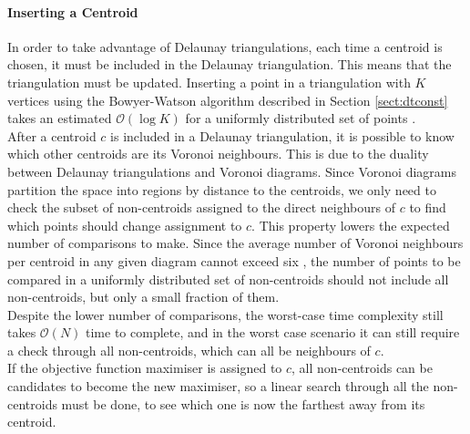 \paragraph{Inserting a Centroid}
In order to take advantage of Delaunay triangulations, each time a centroid is chosen, it must be included in the Delaunay triangulation. This means that the triangulation must be updated. Inserting a point in a triangulation with $K$ vertices using the Bowyer-Watson algorithm described in Section \ref{sect:dtconst} takes an estimated $\mathcal{O}(\log{K})$ for a uniformly distributed set of points \cite{tricomplex}.\\
After a centroid $c$ is included in a Delaunay triangulation, it is possible to know which other centroids are its Voronoi neighbours. This is due to the duality between Delaunay triangulations and Voronoi diagrams.
Since Voronoi diagrams partition the space into regions by distance to the centroids, we only need to check the subset of non-centroids assigned to the direct neighbours of $c$ to find which points should change assignment to $c$. 
This property lowers the expected number of comparisons to make. Since the average number of Voronoi neighbours per centroid in any given diagram cannot exceed six \cite{tricard2} \cite{tricard1}, the number of points to be compared in a uniformly distributed set of non-centroids should not include all non-centroids, but only a small fraction of them.\\
Despite the lower number of comparisons, the worst-case time complexity still takes $\mathcal{O}(N)$ time to complete, and in the worst case scenario it can still require a check through all non-centroids, which can all be neighbours of $c$.\\
If the objective function maximiser is assigned to $c$, all non-centroids can be candidates to become the new maximiser, so a linear search through all the non-centroids must be done, to see which one is now the farthest away from its centroid.

